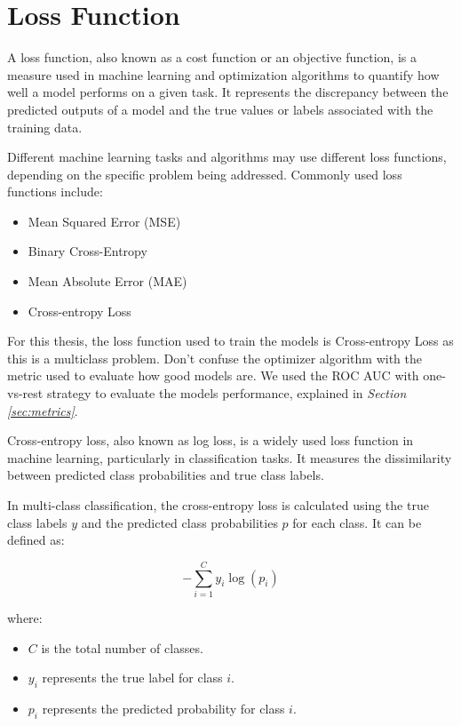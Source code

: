 \section{Loss Function}

A loss function, also known as a cost function or an objective function, is a
measure used in machine learning and optimization algorithms to quantify how
well a model performs on a given task. It represents the discrepancy between
the predicted outputs of a model and the true values or labels associated with
the training data. \newline

Different machine learning tasks and algorithms may use different loss
functions, depending on the specific problem being addressed. Commonly used
loss functions include:

\begin{itemize}
  \item Mean Squared Error (MSE)
  \item Binary Cross-Entropy
  \item Mean Absolute Error (MAE)
  \item Cross-entropy Loss
\end{itemize}

For this thesis, the loss function used to train the models is
Cross-entropy Loss as this is a multiclass problem. Don't confuse the
optimizer algorithm with the metric used to evaluate how good models are. We
used the ROC AUC with one-vs-rest strategy to evaluate the models performance,
explained in \textit{Section \ref{sec:metrics}}. \newline

Cross-entropy loss, also known as log loss, is a widely used loss function in
machine learning, particularly in classification tasks. It measures the
dissimilarity between predicted class probabilities and true class labels.
\newline

In multi-class classification, the cross-entropy loss is calculated using the
true class labels \(y\) and the predicted class probabilities \(p\) for each
class. It can be defined as:

\[-\sum_{i=1}^{C} y_i \log(p_i)\]

\noindent where:

\begin{itemize}
  \item \(C\) is the total number of classes.
  \item \(y_i\) represents the true label for class \(i\).
  \item \(p_i\) represents the predicted probability for class \(i\).
\end{itemize}

